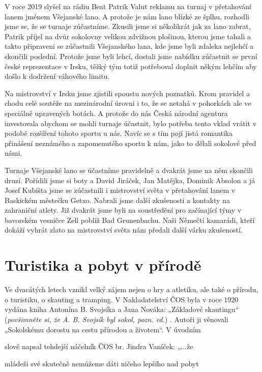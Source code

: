 V roce 2019 slyšel na rádiu Beat Patrik Valut reklamu na turnaj v
přetahování lanem jménem Všejanské lano. A protože je nám lano blízké ze
šplhu, rozhodli jsme se, že se turnaje zúčastníme. Zkusili jsme si
několikrát jak za lano zabrat, Patrik přijel na dvůr sokolovny velikou
zdvižnou plošinou, kterou jsme tahali a takto připraveni se zúčastnili
Všejanského lana, kde jsme byli zdaleka nejlehčí a skončili poslední.
Protože jsme byli lehcí, dostali jsme nabídku zúčastnit se první české
reprezentace v Irsku, těžký tým totiž potřeboval doplnit někým lehčím
aby došlo k dodržení váhového limitu.

Na mistrovství v Irsku jsme zjistili spoustu nových poznatků. Krom
pravidel a chodu celé soutěže na mezinárodní úrovni i to, že se netahá v
pohorkách ale ve speciálně upravených botách. A protože do nás Česká
národní agentura investovala abychom se mohli turnaje účastnit, bylo
potřeba tento vklad vrátit v podobě rozšíření tohoto sportu u nás. Navíc
se s tím pojí jistá romantika přinášení neznámého a zapomenutého sportu
k nám, jako to dělali sokolové před námi.

Turnaje Všejanské lano se účastníme pravidelně a dvakrát jsme na něm
skončili druzí. Pořídili jsme si boty a David Jiráček, Jan Matějka,
Dominik Absolon a já Josef Kubišta jsme se zúčastnili i mistrovství
světa v přetahování lanem v Baskickém městečku Getxo. Nabrali jsme další
zkušenosti a kontakty na zahraniční atlety. Již dvakrát jsme byli na
soustředění pro začínající týmy v bavorském vesničce Zell poblíž Bad
Grunenbachu. Naši Němečtí kamarádi, kteří dokáží vyhrát zlato na
mistrovství světa nám předali další várku zkušeností.

\section{Turistika a pobyt v
přírodě}\label{turistika-a-pobyt-v-pux159uxedrodux11b}

Ve dvacátých letech vznikl velký zájem nejen o hry a atletiku, ale také
o přírodu, o turistiku, o skauting a tramping. V Nakladatelství ČOS byla
v roce 1920 vydána kniha Antonína B. Svojsíka a Jana Nováka: „Základové
skautingu`` (\emph{povšimněte si, že A. B. Svojsík byl sokol, pozn.
ed.}) . Autoři ji věnovali „Sokolskému dorostu na cestu přírodou a
životem``. V úvodním

slově napsal tehdejší náčelník ČOS br. Jindra Vaníček: „...že

mládeži své skutečně nemůžeme dáti ničeho lepšího nad pobyt

